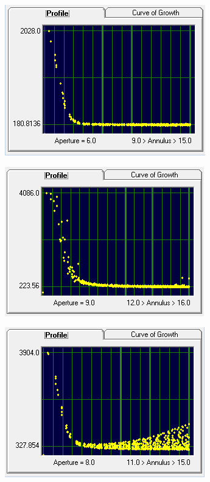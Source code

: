 \documentclass[12pt]{article}
\begin{document}
\begin{figure}[H]
\centering
\begin{multicols}{2}
\begin{minipage}[H]{0.5\textwidth}
\includegraphics[scale=1.0]{Images/AsImages/SS/Sr1-Profile.PNG} \\
\end{minipage}
\begin{minipage}[H]{0.5\textwidth}
\includegraphics[scale=1.0]{Images/AsImages/SS/Sr3-Profile.PNG}
\end{minipage}
\begin{minipage}[H]{0.5\textwidth}
\includegraphics[scale=1.0]{Images/AsImages/SS/Sr2-Profile.PNG} \\

\end{minipage}
\end{multicols}
\end{figure}
\end{document}
